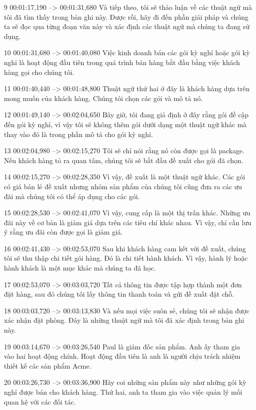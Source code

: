9
00:01:17,190 --> 00:01:31,680
Và tiếp theo, tôi sẽ thảo luận về các thuật ngữ mà tôi đã tìm thấy trong bản ghi này.  Được rồi, hãy đi đến phần giải pháp và chúng ta sẽ đọc qua từng đoạn văn này và xác định các thuật ngữ mà chúng ta đang sử dụng.

10
00:01:31,680 --> 00:01:40,080
Việc kinh doanh bán các gói kỳ nghỉ hoặc gói kỳ nghỉ là hoạt động đầu tiên trong quá trình bán hàng bắt đầu bằng việc khách hàng gọi cho chúng tôi.

11
00:01:40,440 --> 00:01:48,800
Thuật ngữ thứ hai ở đây là khách hàng dựa trên mong muốn của khách hàng.  Chúng tôi chọn các gói và mô tả nó.

12
00:01:49,140 --> 00:02:04,650
Bây giờ, tôi đang giả định ở đây rằng gói đề cập đến gói kỳ nghỉ, vì vậy tôi sẽ không thêm gói dưới dạng một thuật ngữ khác mà thay vào đó là trong phần mô tả cho gói kỳ nghỉ.

13
00:02:04,980 --> 00:02:15,270
Tôi sẽ chỉ nói rằng nó còn được gọi là package.  Nếu khách hàng tỏ ra quan tâm, chúng tôi sẽ bắt đầu đề xuất cho gói đã chọn.

14
00:02:15,270 --> 00:02:28,350
Vì vậy, đề xuất là một thuật ngữ khác.  Các gói có giá bán lẻ đề xuất nhưng nhóm sản phẩm của chúng tôi cũng đưa ra các ưu đãi mà chúng tôi có thể áp dụng cho các gói.

15
00:02:28,530 --> 00:02:41,070
Vì vậy, cung cấp là một thị trấn khác.  Những ưu đãi này về cơ bản là giảm giá dựa trên các tiêu chí khác nhau.  Vì vậy, chỉ cần lưu ý rằng ưu đãi còn được gọi là giảm giá.

16
00:02:41,430 --> 00:02:53,070
Sau khi khách hàng cam kết với đề xuất, chúng tôi sẽ thu thập chi tiết gói hàng.  Đó là chi tiết hành khách.  Vì vậy, hành lý hoặc hành khách là một mục khác mà chúng ta đã học.

17
00:02:53,070 --> 00:03:03,720
Tất cả thông tin được tập hợp thành một đơn đặt hàng, sau đó chúng tôi lấy thông tin thanh toán và gửi đề xuất đặt chỗ.

18
00:03:03,720 --> 00:03:13,830
Và nếu mọi việc suôn sẻ, chúng tôi sẽ nhận được xác nhận đặt phòng.  Đây là những thuật ngữ mà tôi đã xác định trong bản ghi này.

19
00:03:14,670 --> 00:03:26,540
Paul là giám đốc sản phẩm.  Anh ấy tham gia vào hai hoạt động chính.  Hoạt động đầu tiên là anh là người chịu trách nhiệm thiết kế các sản phẩm Acme.

20
00:03:26,730 --> 00:03:36,900
Hãy coi những sản phẩm này như những gói kỳ nghỉ được bán cho khách hàng.  Thứ hai, anh ta tham gia vào việc quản lý mối quan hệ với các đối tác.

